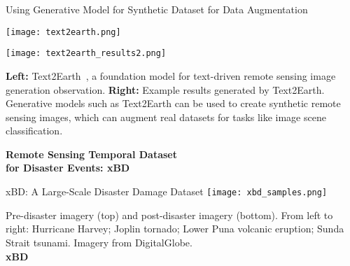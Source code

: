 \begin{refsection}
  \begin{frame}{Using Generative Model for Synthetic Dataset for Data Augmentation}
    \begin{minipage}{0.65\linewidth}
      \centering
      \texttt{[image: text2earth.png]}
      
    \end{minipage}
    \hfill
    \begin{minipage}{0.33\linewidth}
      \centering
      \texttt{[image: text2earth\_results2.png]}
      
    \end{minipage}
    \vspace{1em}
    
    \scriptsize
    \textbf{Left:} Text2Earth~\parencite{text2earth2025}, a foundation model for text-driven remote sensing image generation observation. \textbf{Right:} Example results generated by Text2Earth. 
    Generative models such as Text2Earth can be used to create synthetic remote sensing images, which can augment real datasets for tasks like image scene classification.
    \bottomleftrefs
  \end{frame}
\end{refsection}

\begin{refsection}
  \begin{frame}
    \centering
    \vspace{2.5cm}
    {\LARGE \textbf{Remote Sensing Temporal Dataset}\\[0.5em]
    \textbf{for Disaster Events: xBD}}
  \end{frame}
\end{refsection}

\begin{refsection}
  \begin{frame}{xBD: A Large-Scale Disaster Damage Dataset}
    \centering
    \texttt{[image: xbd\_samples.png]}
    
    \vspace{0.5em}
    \scriptsize
    Pre-disaster imagery (top) and post-disaster imagery (bottom). From left to right: Hurricane Harvey; Joplin tornado; Lower Puna volcanic eruption; Sunda Strait tsunami. Imagery from DigitalGlobe.\\
    \textbf{xBD}~\parencite{guptaCreatingXBDDataset2019}
    \bottomleftrefs
  \end{frame}
\end{refsection}

